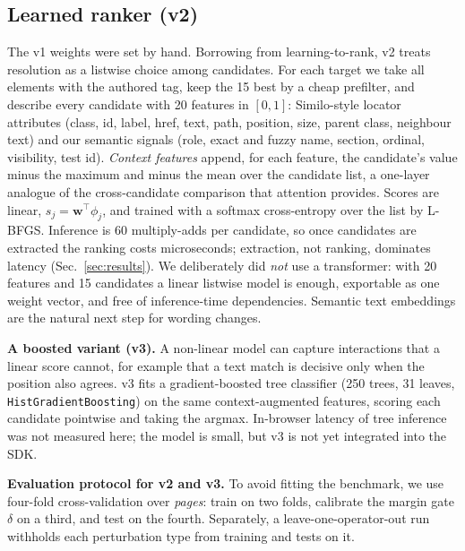 \documentclass[conference]{IEEEtran}
\begin{document}
\subsection{Learned ranker (v2)}\label{sec:v2}
The v1 weights were set by hand. Borrowing from learning-to-rank, v2 treats resolution as a listwise choice among candidates. For each target we take all elements with the authored tag, keep the 15 best by a cheap prefilter, and describe every candidate with 20 features in $[0,1]$: Similo-style locator attributes (class, id, label, href, text, path, position, size, parent class, neighbour text) and our semantic signals (role, exact and fuzzy name, section, ordinal, visibility, test id). \emph{Context features} append, for each feature, the candidate's value minus the maximum and minus the mean over the candidate list, a one-layer analogue of the cross-candidate comparison that attention provides. Scores are linear, $s_j=\mathbf w^{\top}\phi_j$, and trained with a softmax cross-entropy over the list by L-BFGS. Inference is 60 multiply-adds per candidate, so once candidates are extracted the ranking costs microseconds; extraction, not ranking, dominates latency (Sec.~\ref{sec:results}). We deliberately did \emph{not} use a transformer: with 20 features and 15 candidates a linear listwise model is enough, exportable as one weight vector, and free of inference-time dependencies. Semantic text embeddings are the natural next step for wording changes.

\textbf{A boosted variant (v3).} A non-linear model can capture interactions that a linear score cannot, for example that a text match is decisive only when the position also agrees. v3 fits a gradient-boosted tree classifier (250 trees, 31 leaves, \texttt{HistGradientBoosting}) on the same context-augmented features, scoring each candidate pointwise and taking the argmax. In-browser latency of tree inference was not measured here; the model is small, but v3 is not yet integrated into the SDK.

\textbf{Evaluation protocol for v2 and v3.} To avoid fitting the benchmark, we use four-fold cross-validation over \emph{pages}: train on two folds, calibrate the margin gate $\delta$ on a third, and test on the fourth. Separately, a leave-one-operator-out run withholds each perturbation type from training and tests on it.
\end{document}
